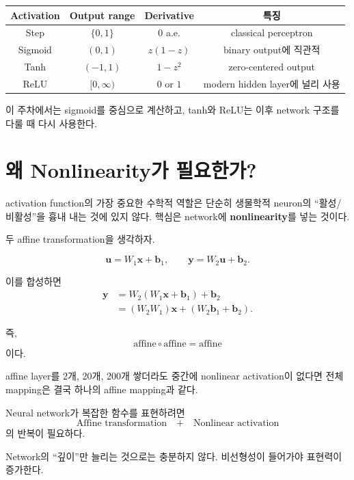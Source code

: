 \documentclass[11pt,a4paper]{article}
\newcommand{\vect}[1]{\bm{#1}}
\begin{document}
\begin{center}
\begin{tabular}{c|c|c|c}
\toprule
Activation & Output range & Derivative & 특징\\
\midrule
Step & $\{0,1\}$ & $0$ a.e. & classical perceptron\\
Sigmoid & $(0,1)$ & $z(1-z)$ & binary output에 직관적\\
Tanh & $(-1,1)$ & $1-z^2$ & zero-centered output\\
ReLU & $[0,\infty)$ & $0$ or $1$ & modern hidden layer에 널리 사용\\
\bottomrule
\end{tabular}
\end{center}

이 주차에서는 sigmoid를 중심으로 계산하고,
tanh와 ReLU는 이후 network 구조를 다룰 때 다시 사용한다.

\section{왜 Nonlinearity가 필요한가?}

activation function의 가장 중요한 수학적 역할은
단순히 생물학적 neuron의 ``활성/비활성''을 흉내 내는 것에 있지 않다.
핵심은 network에 \textbf{nonlinearity}를 넣는 것이다.

두 affine transformation을 생각하자.

\[
\vect{u}=W_1\vect{x}+\vect{b}_1,
\qquad
\vect{y}=W_2\vect{u}+\vect{b}_2.
\]

이를 합성하면
\[
\begin{aligned}
\vect{y}
&=
W_2(W_1\vect{x}+\vect{b}_1)+\vect{b}_2\\
&=
(W_2W_1)\vect{x}+(W_2\vect{b}_1+\vect{b}_2).
\end{aligned}
\]

즉,
\[
\boxed{
\text{affine}\circ\text{affine}
=
\text{affine}
}
\]
이다.

affine layer를 2개, 20개, 200개 쌓더라도
중간에 nonlinear activation이 없다면 전체 mapping은 결국 하나의 affine mapping과 같다.

\begin{keybox}
Neural network가 복잡한 함수를 표현하려면
\[
\boxed{
\text{Affine transformation}
\quad+\quad
\text{Nonlinear activation}
}
\]
의 반복이 필요하다.

Network의 ``깊이''만 늘리는 것으로는 충분하지 않다.
비선형성이 들어가야 표현력이 증가한다.
\end{keybox}
\end{document}
